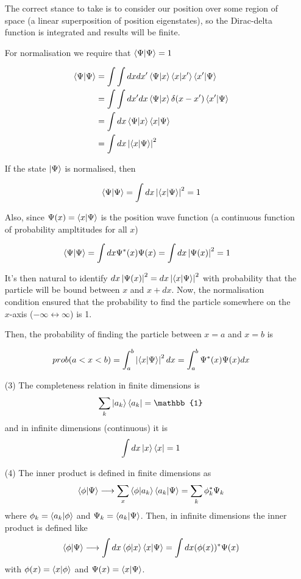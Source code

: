 \documentclass[english, 11pt]{article}
\begin{document}
\begin{itemize}
      The correct stance to take is to consider our position over some region of space (a linear superposition of position eigenstates), so the Dirac-delta function is integrated and results will be finite.
      \newline

      For normalisation we require that $\braket{\Psi}{\Psi} = 1$

      \begin{align*}
        \braket{\Psi}{\Psi} & = \int \int dx dx' \braket{\Psi}{x}\braket{x}{x'}\braket{x'}{\Psi} \\
                            & = \int \int dx' dx \braket{\Psi}{x}\delta(x-x')\braket{x'}{\Psi} \\
                            & = \int dx \braket{\Psi}{x}\braket{x}{\Psi} \\
                            & = \int dx \pr{\braket{x}{\Psi}}
      \end{align*}

      If the state $\left|\Psi\right\rangle$ is normalised, then

      \[ \braket{\Psi}{\Psi} = \int dx \pr{\braket{x}{\Psi}} = 1 \]

      Also, since $\Psi(x) = \braket{x}{\Psi}$ is the position wave function (a continuous function of probability ampltitudes for all $x$)

      \begin{align*}
        \braket{\Psi}{\Psi} & = \int dx \Psi^*(x)\Psi(x) = \int dx \pr{\Psi(x)} = 1
      \end{align*}

      It's then natural to identify $dx \pr{\Psi(x)} = dx \pr{\braket{x}{\Psi}}$ with probability that the particle will be bound between $x$ and $x + dx$. Now, the normalisation condition ensured that the probability to find the particle somewhere on the $x$-axis ($-\infty \leftrightarrow \infty$) is 1.

      Then, the probability of finding the particle between $x=a$ and $x=b$ is

      \[ prob(a<x<b) = \int_a^b \pr{\braket{x}{\Psi}} dx = \int_a^b \Psi^*(x)\Psi(x) dx \]

      \item[(3)] The completeness relation in finite dimensions is
      \[ \sum_k \ket{a_k}\bra{a_k} = \mathbb{1} \]
      and in infinite dimensions (continuous) it is
      \[ \int dx \left|x\right\rangle\left\langle x\right| = 1 \]

      \item[(4)] The inner product is defined in finite dimensions as
      \[ \braket{\phi}{\Psi} \longrightarrow \sum_x \braket{\phi}{a_k}\braket{a_k}{\Psi} = \sum_k \phi_k^*\Psi_k \]
      where $\phi_k = \braket{a_k}{\phi}$ and $\Psi_k = \braket{a_k}{\Psi}$. Then, in infinite dimensions the inner product is defined like
      \[ \braket{\phi}{\Psi} \longrightarrow \int dx \braket{\phi}{x}\braket{x}{\Psi} = \int dx (\phi(x))^*\Psi(x)  \]
      with $\phi(x) = \braket{x}{\phi}$ and $\Psi(x) = \braket{x}{\Psi}$.


\end{itemize}
\end{document}
